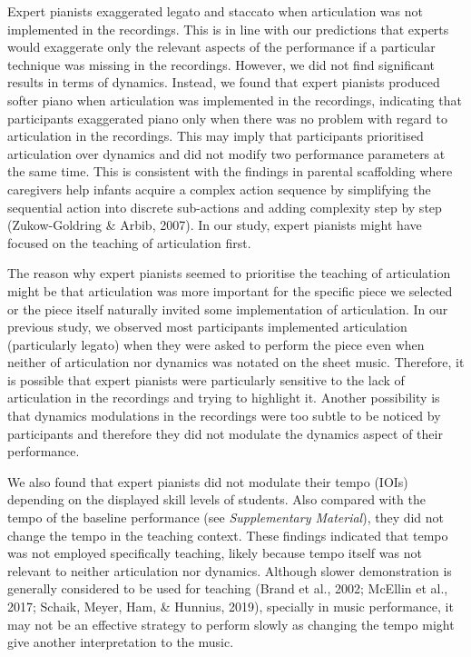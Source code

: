 \documentclass[
  man,floatsintext]{apa6}
\begin{document}
Expert pianists exaggerated legato and staccato when articulation was not implemented in the recordings. This is in line with our predictions that experts would exaggerate only the relevant aspects of the performance if a particular technique was missing in the recordings. However, we did not find significant results in terms of dynamics. Instead, we found that expert pianists produced softer piano when articulation was implemented in the recordings, indicating that participants exaggerated piano only when there was no problem with regard to articulation in the recordings. This may imply that participants prioritised articulation over dynamics and did not modify two performance parameters at the same time. This is consistent with the findings in parental scaffolding where caregivers help infants acquire a complex action sequence by simplifying the sequential action into discrete sub-actions and adding complexity step by step (Zukow-Goldring \& Arbib, 2007). In our study, expert pianists might have focused on the teaching of articulation first.

The reason why expert pianists seemed to prioritise the teaching of articulation might be that articulation was more important for the specific piece we selected or the piece itself naturally invited some implementation of articulation. In our previous study, we observed most participants implemented articulation (particularly legato) when they were asked to perform the piece even when neither of articulation nor dynamics was notated on the sheet music. Therefore, it is possible that expert pianists were particularly sensitive to the lack of articulation in the recordings and trying to highlight it. Another possibility is that dynamics modulations in the recordings were too subtle to be noticed by participants and therefore they did not modulate the dynamics aspect of their performance.

We also found that expert pianists did not modulate their tempo (IOIs) depending on the displayed skill levels of students. Also compared with the tempo of the baseline performance (see \emph{Supplementary Material}), they did not change the tempo in the teaching context. These findings indicated that tempo was not employed specifically teaching, likely because tempo itself was not relevant to neither articulation nor dynamics. Although slower demonstration is generally considered to be used for teaching (Brand et al., 2002; McEllin et al., 2017; Schaik, Meyer, Ham, \& Hunnius, 2019), specially in music performance, it may not be an effective strategy to perform slowly as changing the tempo might give another interpretation to the music.
\end{document}
